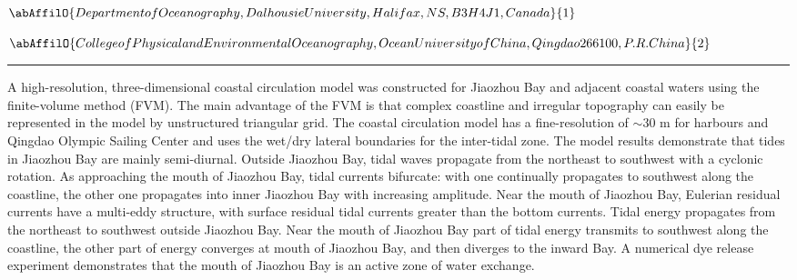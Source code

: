 \begin{center}
   \vspace{2 mm} \begin{center}
    \vspace{2 mm}\begin{center}
  
  $\abAffilO{Department of Oceanography, Dalhousie University, Halifax, NS, B3H 4J1, Canada}{1}$

  
  $\abAffilO{College of Physical and Environmental Oceanography, Ocean University of China, Qingdao 266100, P. R. China}{2}$

  \end{center}
  \vspace{2 mm}
  \end{center}\end{center}
  \begin{center}\rule{0.70\linewidth}{0.5 pt}\end{center}

\noindent A high-resolution, three-dimensional coastal circulation model was constructed for Jiaozhou Bay and adjacent coastal waters using the finite-volume method (FVM). The main advantage of the FVM is that complex coastline and irregular topography can easily be represented in the model by unstructured triangular grid. The coastal circulation model has a fine-resolution of $\sim$30 m for harbours and Qingdao Olympic Sailing Center and uses the wet/dry lateral boundaries for the inter-tidal zone. The model results demonstrate that tides in Jiaozhou Bay are mainly semi-diurnal. Outside Jiaozhou Bay, tidal waves propagate from the northeast to southwest with a cyclonic rotation. As approaching the mouth of Jiaozhou Bay, tidal currents bifurcate: with one continually propagates to southwest along the coastline, the other one propagates into inner Jiaozhou Bay with increasing amplitude. Near the mouth of Jiaozhou Bay, Eulerian residual currents have a multi-eddy structure, with surface residual tidal currents greater than the bottom currents. Tidal energy propagates from the northeast to southwest outside Jiaozhou Bay. Near the mouth of Jiaozhou Bay part of tidal energy transmits to southwest along the coastline, the other part of energy converges at mouth of Jiaozhou Bay, and then diverges to the inward Bay. A numerical dye release experiment demonstrates that the mouth of Jiaozhou Bay is an active zone of water exchange.

